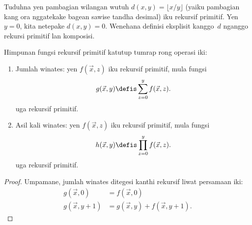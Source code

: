 \documentclass[../../../include/open-logic-section]{subfiles}
\begin{document}
\begin{prob}
Tuduhna yen pambagian wilangan wutuh $d(x, y) = \lfloor x/y \rfloor$
(yaiku pambagian kang ora nggatekake bagean sawise tandha desimal)
iku rekursif primitif. Yen $y = 0$, kita netepake
$d(x, y) = 0$. Wenehana definisi eksplisit kanggo~$d$
nganggo rekursi primitif lan komposisi.
\end{prob}

\begin{prop}
Himpunan fungsi rekursif primitif katutup tumrap
rong operasi iki:
\begin{enumerate}
\item Jumlah winates: yen $f(\vec x, z)$ iku rekursif primitif,
mula fungsi
\[
g(\vec x, y) \defis \sum_{z = 0}^y f(\vec x, z).
\]
uga rekursif primitif.
\item Asil kali winates: yen $f(\vec x, z)$ iku rekursif
primitif, mula fungsi
\[
h(\vec x, y) \defis \prod_{z = 0}^y f(\vec x, z).
\]
uga rekursif primitif.
\end{enumerate}
\end{prop}

\begin{proof}
Umpamane, jumlah winates ditegesi kanthi rekursif liwat
persamaan iki:
\begin{align*}
  g(\vec x, 0) & = f(\vec x, 0)\\
  g(\vec x, y+1) & = g(\vec x, y) + f(\vec x, y+1).
\end{align*}
\end{proof}
\end{document}
